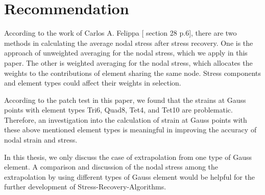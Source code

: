 \section{Recommendation}
According to the work of Carlos A. Felippa [\cite{Felippa} section 28 p.6], there are two methods in calculating the average nodal stress after stress recovery. One is the approach of unweighted averaging for the nodal stress, which we apply in this paper. The other is weighted averaging for the nodal stress, which allocates the weights to the contributions of element sharing the same node. Stress components and element types could affect their weights in selection.

According to the patch test in this paper, we found that the strains at Gauss points with element types Tri6, Quad8, Tet4, and Tet10 are problematic. Therefore, an investigation into the calculation of strain at Gauss points with these above mentioned element types is meaningful in improving the accuracy of nodal strain and stress. 

 In this thesis, we only discuss the case of extrapolation from one type of Gauss element. A comparison and discussion of the nodal stress among the extrapolation by using different types of Gauss element would be helpful for the further development of Stress-Recovery-Algorithms. 

\cite{qwe}
\cite{Wang}
\cite{Felippa}\cite{qwe}